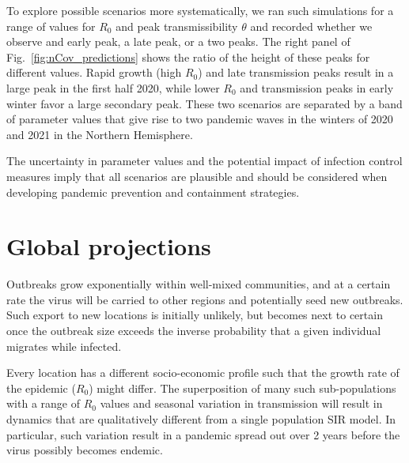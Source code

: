 \documentclass[rmp, reprint, superscriptaddress, floatfix,amsmath]{revtex4-1}
\begin{document}
To explore possible scenarios more systematically, we ran such simulations for a range of values for $R_0$ and peak transmissibility $\theta$ and recorded whether we observe and early peak, a late peak, or a two peaks. 
The right panel of Fig.~\ref{fig:nCov_predictions} shows the ratio of the height of these peaks for different values.
Rapid growth (high $R_0$) and late transmission peaks result in a large peak in the first half 2020, while lower $R_0$ and transmission peaks in early winter favor a large secondary peak. 
These two scenarios are separated by a band of parameter values that give rise to two pandemic waves in the winters of 2020 and 2021 in the Northern Hemisphere.

The uncertainty in parameter values and the potential impact of infection control measures imply that all scenarios are plausible and should be considered when developing pandemic prevention and containment strategies.


\section{Global projections}
Outbreaks grow exponentially within well-mixed communities, and at a certain rate the virus will be carried to other regions and potentially seed new outbreaks. 
Such export to new locations is initially unlikely, but becomes next to certain once the outbreak size exceeds the inverse probability that a given individual migrates while infected.

Every location has a different socio-economic profile such that the growth rate of the epidemic ($R_0$) might differ. 
The superposition of many such sub-populations with a range of $R_0$ values and seasonal variation in transmission will result in dynamics that are qualitatively different from a single population SIR model. 
In particular, such variation result in a pandemic spread out over 2 years before the virus possibly becomes endemic. 
\end{document}
